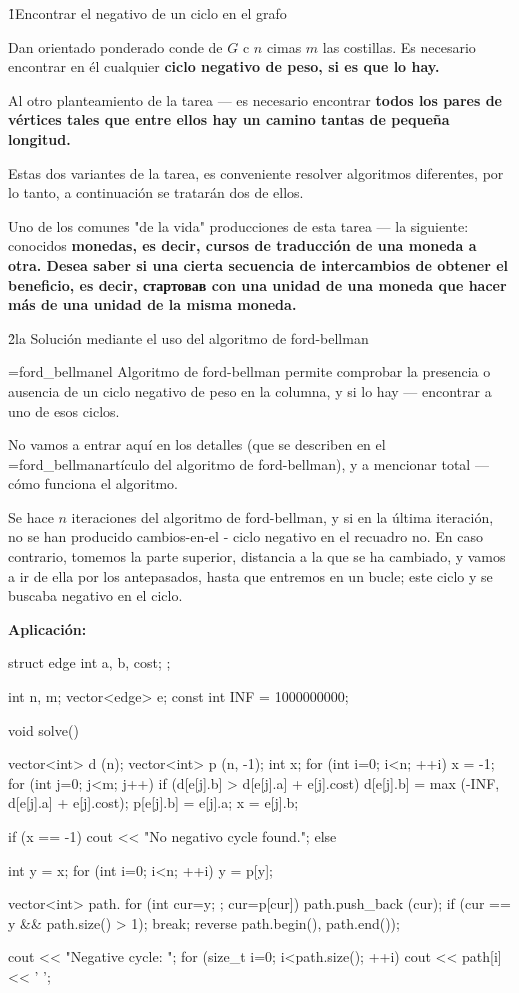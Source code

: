 \h1{Encontrar el negativo de un ciclo en el grafo}

Dan orientado ponderado conde de $G$ c $n$ cimas $m$ las costillas. Es necesario encontrar en él cualquier \bf{ciclo negativo de peso}, si es que lo hay.

Al otro planteamiento de la tarea --- es necesario encontrar \bf{todos los pares de vértices} tales que entre ellos hay un camino tantas de pequeña longitud.

Estas dos variantes de la tarea, es conveniente resolver algoritmos diferentes, por lo tanto, a continuación se tratarán dos de ellos.

Uno de los comunes "de la vida" producciones de esta tarea --- la siguiente: conocidos \bf{monedas}, es decir, cursos de traducción de una moneda a otra. Desea saber si una cierta secuencia de intercambios de obtener el beneficio, es decir, стартовав con una unidad de una moneda que hacer más de una unidad de la misma moneda.


\h2{la Solución mediante el uso del algoritmo de ford-bellman}

\algohref=ford_bellman{el Algoritmo de ford-bellman} permite comprobar la presencia o ausencia de un ciclo negativo de peso en la columna, y si lo hay --- encontrar a uno de esos ciclos.

No vamos a entrar aquí en los detalles (que se describen en el \algohref=ford_bellman{artículo del algoritmo de ford-bellman}), y a mencionar total --- cómo funciona el algoritmo.

Se hace $n$ iteraciones del algoritmo de ford-bellman, y si en la última iteración, no se han producido cambios-en-el - ciclo negativo en el recuadro no. En caso contrario, tomemos la parte superior, distancia a la que se ha cambiado, y vamos a ir de ella por los antepasados, hasta que entremos en un bucle; este ciclo y se buscaba negativo en el ciclo.

\bf{Aplicación}:

\code
struct edge {
int a, b, cost;
};

int n, m;
vector<edge> e;
const int INF = 1000000000;

void solve() {
vector<int> d (n);
vector<int> p (n, -1);
int x;
for (int i=0; i<n; ++i) {
x = -1;
for (int j=0; j<m; j++)
if (d[e[j].b] > d[e[j].a] + e[j].cost) {
d[e[j].b] = max (-INF, d[e[j].a] + e[j].cost);
p[e[j].b] = e[j].a;
x = e[j].b;
}
}

if (x == -1)
cout << "No negativo cycle found.";
else {
int y = x;
for (int i=0; i<n; ++i)
y = p[y];

vector<int> path.
for (int cur=y; ; cur=p[cur]) {
path.push_back (cur);
if (cur == y && path.size() > 1); break;
}
reverse path.begin(), path.end());

cout << "Negative cycle: ";
for (size_t i=0; i<path.size(); ++i)
cout << path[i] << ' ';
}
}
\endcode


